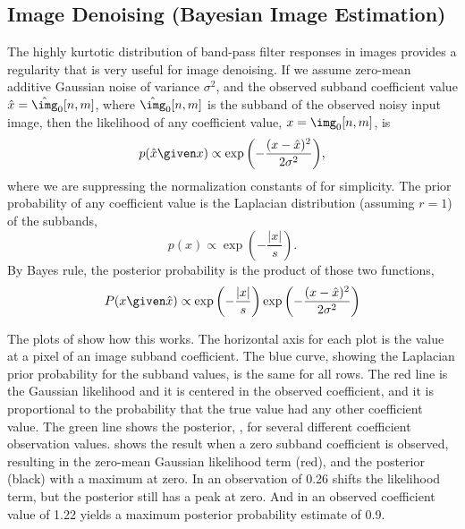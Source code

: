 
\subsection{Image Denoising (Bayesian Image Estimation)}

The highly kurtotic distribution of band-pass filter responses in images provides a regularity that is very useful for image denoising.  
If we assume zero-mean additive Gaussian noise of variance $\sigma^2$, and the observed subband coefficient value $\hat{x} = \hat\img_0 [n,m]$, where $\hat\img_0 [n,m]$ is the subband of the observed noisy input image, then the likelihood of any coefficient value, $x=\img_0 [n,m]$, is
\begin{equation}
p(\hat{x} \given x) \propto \exp{ \left( -\frac{(x - \hat{x})^2}{2 \sigma^2} \right) }, 
\end{equation}
where we are suppressing the normalization constants of \eqn{\ref{eq:derdist}} for simplicity.
The prior probability of any coefficient value is the Laplacian distribution (assuming $r=1$) of the subbands,
\begin{equation}
p(x) \propto \exp{ \left( -\frac{\left| x \right|}{s} \right) }.
\end{equation}
By Bayes rule, the posterior probability is the product of those two functions, 
\begin{equation}
P(x \given \hat{x}) \propto \exp{ \left( -\frac{\left| x \right|}{s} \right)} \exp{ \left( -\frac{(x - \hat{x})^2}{2 \sigma^2} \right) }
\label{eq:posterior_w_given_y}
\end{equation}

The plots of \fig{\ref{fig:waveletBayes}} show how this works.  The horizontal axis for each plot is the value at a pixel of an image subband coefficient.  The blue curve, showing the Laplacian prior probability for the subband values, is the same for all rows. The red line is the Gaussian likelihood and it is centered in the observed coefficient, and it is proportional to the probability that the true value had any other coefficient value. The green line shows the posterior, \eqn{\ref{eq:posterior_w_given_y}}, for several different coefficient observation values.   shows the result when a zero subband coefficient is observed, resulting in the zero-mean Gaussian likelihood term (red), and the posterior (black) with a maximum at zero.  In  an observation of 0.26 shifts the likelihood term, but the posterior still has a peak at zero.  And in  an observed coefficient value of 1.22 yields a maximum posterior probability estimate of 0.9.


